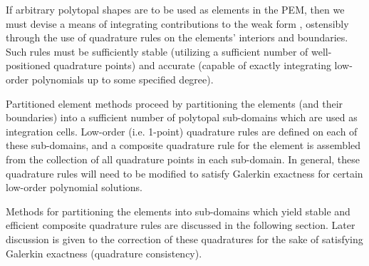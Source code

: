 		
If arbitrary polytopal shapes are to be used as elements in the PEM, then we must devise a means of integrating contributions to the weak form	, ostensibly through the use of quadrature rules on the elements' interiors and boundaries. Such rules must be sufficiently stable (utilizing a sufficient number of well-positioned quadrature points) and accurate (capable of exactly integrating low-order polynomials up to some specified degree).
	
Partitioned element methods proceed by partitioning the elements (and their boundaries) into a sufficient number of polytopal sub-domains which are used as integration cells. Low-order (i.e. 1-point) quadrature rules are defined on each of these sub-domains, and a composite quadrature rule for the element is assembled from the collection of all quadrature points in each sub-domain. In general, these quadrature rules will need to be modified to satisfy Galerkin exactness for certain low-order polynomial solutions.
	
Methods for partitioning the elements into sub-domains which yield stable and efficient composite quadrature rules are discussed in the following section. Later discussion is given to the correction of these quadratures for the sake of satisfying Galerkin exactness (quadrature consistency).
		
